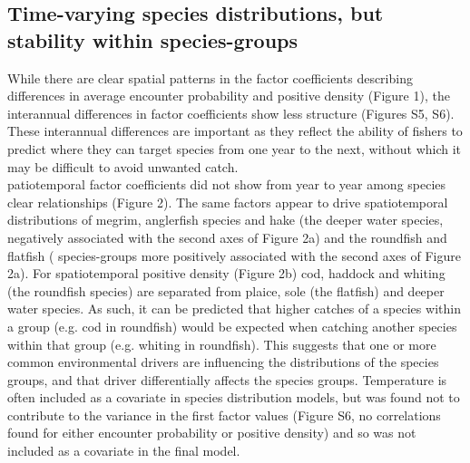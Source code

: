 \documentclass[fleqn,10pt]{wlscirep}
\begin{document}
\begin{linenumbers}
\subsection*{Time-varying species distributions, but stability within
	 species-groups\\} 
While there are clear spatial patterns in the factor coefficients describing
differences in average  encounter probability and
positive density (Figure 1), the interannual differences in factor coefficients
show less structure (Figures S5, S6). These interannual differences are
important as they reflect the ability of fishers to predict where they can
target  species from one year to the next, without which
it may be difficult to 
avoid unwanted catch.\\

patiotemporal factor coefficients  did not show
 from year to year
  among
species  clear relationships
 (Figure
2).  The same factors appear to drive spatiotemporal  distributions of megrim, anglerfish species and hake (the
deeper water species,   negatively associated with the second axes of Figure 2a)
and the roundfish and flatfish (
species-groups more positively associated with the second
axes of Figure 2a). For spatiotemporal positive density (Figure 2b) cod,
haddock and whiting (the roundfish species) are separated from plaice, sole
(the flatfish) and deeper water species. As such, it can
be predicted that higher catches of a species within a
group (e.g. cod in roundfish) would be expected when
catching another species within that group (e.g.
whiting in roundfish). This suggests that one or more common environmental
drivers are influencing the distributions of the species groups, and that
driver differentially affects the species groups.  Temperature is often
included as a covariate in species distribution models, but was found not to
contribute to the variance in the first factor values (Figure S6, no
correlations found for either  encounter
probability or positive density) and so was not included as a covariate in the
final model.\\


\end{linenumbers}
\end{document}
